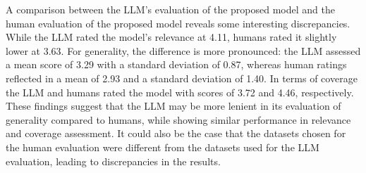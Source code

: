 A comparison between the LLM's evaluation of the proposed model and the human evaluation of the proposed model reveals some interesting discrepancies. While the LLM rated the model's relevance at 4.11, humans rated it slightly lower at 3.63. For generality, the difference is more pronounced: the LLM assessed a mean score of 3.29 with a standard deviation of 0.87, whereas human ratings reflected in a mean of 2.93 and a standard deviation of 1.40. In terms of coverage the LLM and humans rated the model with scores of 3.72 and 4.46, respectively. These findings suggest that the LLM may be more lenient in its evaluation of generality compared to humans, while showing similar performance in relevance and coverage assessment. It could also be the case that the datasets chosen for the human evaluation were different from the datasets used for the LLM evaluation, leading to discrepancies in the results.













